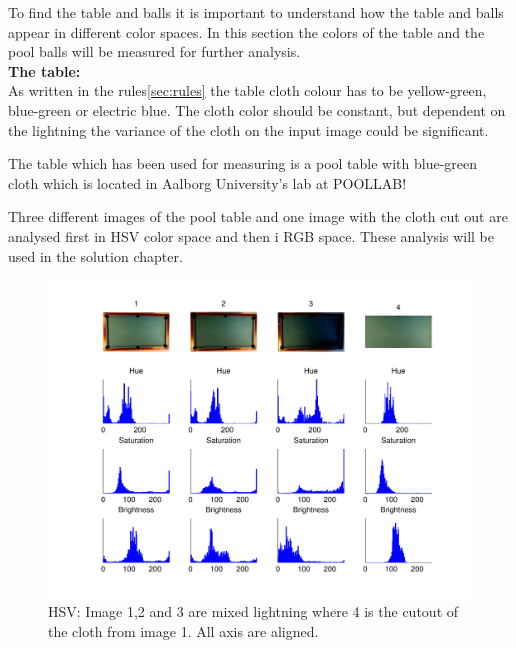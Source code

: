 To find the table and balls it is important to understand how the table and balls appear in different color spaces. In this section the colors of the table and the pool balls will be measured for further analysis.\\

\textbf{The table:}\\
As written in the rules\ref{sec:rules} the table cloth colour has to be yellow-green, blue-green or electric blue. The cloth color should be constant, but dependent on the lightning the variance of the cloth on the input image could be significant.

The table which has been used for measuring is a pool table with blue-green cloth which is located in Aalborg University's lab at POOLLAB!

Three different images of the pool table and one image with the cloth cut out are analysed first in HSV color space and then i RGB space. These analysis will be used in the solution chapter.

\begin{figure}[H]
\begin{center}
\leavevmode
\includegraphics[width=1\textwidth]{images/hsv_hist_table}
\end{center}
\caption{HSV: Image 1,2 and 3 are mixed lightning where 4 is the cutout of the cloth from image 1. All axis are aligned.}
\label{fig:tablehsv}
\end{figure}

